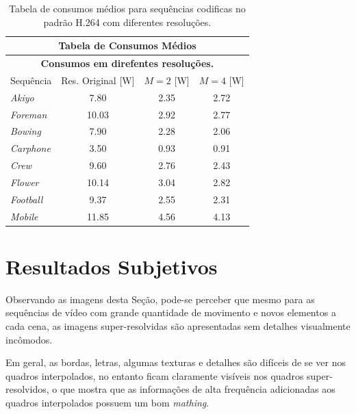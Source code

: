 \begin{table}[hbt]
\centering
\caption{Tabela de consumos médios para sequências codificas no padrão H.264 com diferentes resoluções.}	
\label{consumoH264}
\begin{tabular}{|l|c|c|c|}
\hline
\multicolumn{4}{|c|}{\textbf{Tabela  de Consumos Médios}}\\
\hline
\hline
\multicolumn{4}{|c|}{\textbf{Consumos em direfentes resoluções. }}\\
\hline
\hline			
Sequência  & Res. Original [W]& $M = 2$ [W]&$M = 4$ [W]  \\
\hline
\hline
\textit{Akiyo}		&7.80  &2.35   &2.72\\
\hline
\textit{Foreman}		&10.03 &2.92   &2.77\\
\hline
\textit{Bowing}		&7.90 &2.28   &2.06\\
\hline
\textit{Carphone}	& 3.50 & 0.93   &0.91\\
\hline
\textit{Crew}		& 9.60 & 2.76   &2.43\\
\hline
\textit{Flower}		&10.14 &3.04   &2.82\\
\hline
\textit{Football}	&9.37 &2.55  &2.31\\
\hline
\textit{Mobile}	&11.85 &4.56   &4.13\\
\hline
\end{tabular}
\end{table}

\section{Resultados Subjetivos}

Observando as imagens desta Seção, pode-se perceber que mesmo para as sequências de vídeo com grande quantidade de movimento e novos elementos a cada cena, as imagens super-resolvidas são apresentadas sem detalhes visualmente incômodos. 

Em geral, as bordas, letras, algumas texturas e detalhes são difíceis de se ver nos quadros interpolados, no entanto ficam claramente visíveis nos quadros super-resolvidos, o que mostra que as informações de alta frequência adicionadas aos quadros interpolados possuem um bom \textit{mathing}. 
\clearpage
